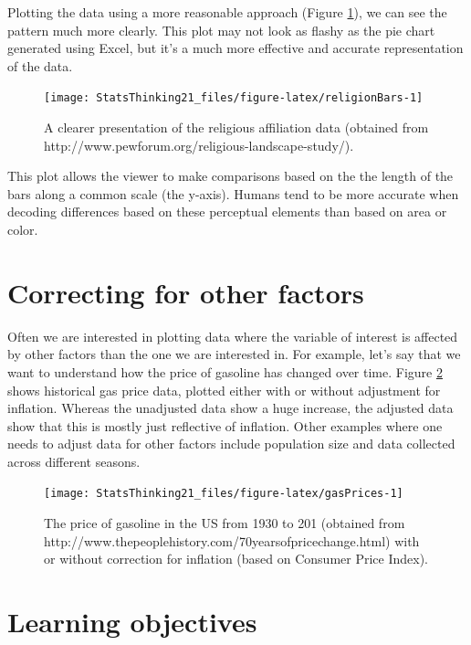\documentclass[12pt,]{book}
\theoremstyle{definition}
\theoremstyle{definition}
\theoremstyle{definition}
\theoremstyle{remark}
\begin{document}
Plotting the data using a more reasonable approach (Figure \ref{fig:religionBars}), we can see the pattern much more clearly. This plot may not look as flashy as the pie chart generated using Excel, but it's a much more effective and accurate representation of the data.

\begin{figure}
\texttt{[image: StatsThinking21\_files/figure-latex/religionBars-1]} \caption{A clearer presentation of the religious affiliation data (obtained from http://www.pewforum.org/religious-landscape-study/).}\label{fig:religionBars}
\end{figure}

This plot allows the viewer to make comparisons based on the the length of the bars along a common scale (the y-axis). Humans tend to be more accurate when decoding differences based on these perceptual elements than based on area or color.

\hypertarget{correcting-for-other-factors}{%
\section{Correcting for other factors}\label{correcting-for-other-factors}}

Often we are interested in plotting data where the variable of interest is affected by other factors than the one we are interested in. For example, let's say that we want to understand how the price of gasoline has changed over time. Figure \ref{fig:gasPrices} shows historical gas price data, plotted either with or without adjustment for inflation. Whereas the unadjusted data show a huge increase, the adjusted data show that this is mostly just reflective of inflation. Other examples where one needs to adjust data for other factors include population size and data collected across different seasons.

\begin{figure}
\texttt{[image: StatsThinking21\_files/figure-latex/gasPrices-1]} \caption{The price of gasoline in the US from 1930 to 201 (obtained from http://www.thepeoplehistory.com/70yearsofpricechange.html) with or without correction for inflation (based on Consumer Price Index).}\label{fig:gasPrices}
\end{figure}

\hypertarget{learning-objectives-3}{%
\section{Learning objectives}\label{learning-objectives-3}}
\end{document}
